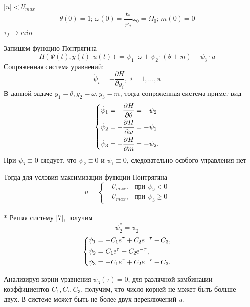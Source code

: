 \documentclass[a4paper,14pt]{article}
\theoremstyle{plain} %
\theoremstyle{definition} %
\theoremstyle{remark} %
\begin{document}
{$|u|<U_{max}$
\[
    \theta(0)=1;\ \omega(0)=\frac{t_\ast}{\varphi_\ast}\omega_0=\Omega_0;\ m(0)=0
\]
$\tau_f\to min$

Запишем функцию Понтрягина
\[
    H(\Psi(t),y(t),u(t))=\psi_1\cdot\omega+\psi_2\cdot(\theta+m)+\psi_3\cdot u
\]
Сопряженная система уравнений:
\[
    \dot{\psi}_i  =  - \frac{{\partial H}}{{\partial y_i }},\,\,i = 1, \ldots ,n
\]
В данной задаче $y_1 = \theta, y_2 = \omega, y_3=m$, тогда сопряженная система примет вид
\begin{equation} \label{7}
    \left\{ {\begin{aligned}
                 & \dot \psi _1  =  - \frac{{\partial H}}{{\partial \theta}} = - \psi_2\hfill   \\
                 & \dot \psi _2   =  - \frac{{\partial H}}{{\partial \omega }} = - \psi_1\hfill \\
                 & \dot \psi _3   =  - \frac{{\partial H}}{{\partial m }} = - \psi_2 . \hfill   \\
            \end{aligned}} \right.
\end{equation}
При $\psi_3\equiv0$ следует, что $\psi_2\equiv0$ и $\psi_1\equiv0$, следовательно особого управления нет

Тогда для условия максимизации функции Понтрягина
\[
    u=
    \begin{cases}
        -U_{max}, & \text{при $\psi_3<0$}    \\
        +U_{max}, & \text{при $\psi_3\geq0$}
    \end{cases}
\]\\*
Решая систему \eqref{7}, получим
\[
    \psi^{''}_2=\psi_2
\]
\begin{equation}\label{psisystem}
    \left\{ {\begin{aligned}
                 & \psi_1 = -C_1e^\tau+C_2e^{-\tau}+C_3, \hfill  \\
                 & \psi_2 = C_1e^\tau+C_2e^{-\tau} , \hfill      \\
                 & \psi_3 = -C_1e^\tau+C_2e^{-\tau}+C_3 . \hfill \\
            \end{aligned}} \right.
\end{equation}

Анализируя корни уравнения $\psi_3(\tau)=0$, для различной комбинации
коэффициентов $C_1,C_2,C_3$, получим, что число корней не может быть больше двух. В системе может быть не более двух переключений $u$.

}
\end{document}

